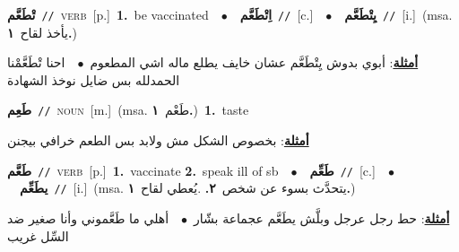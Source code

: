 \documentclass[10pt,a4paper,twoside]{article} %
\begin{document}
\begin{multicols}{2}
{\setlength\topsep{0pt}\textbf{\foreignlanguage{arabic}{تْطَعَّم}}\ {\color{gray}\texttt{//}\color{black}}\ \textsc{verb}\ [p.]\ \textbf{1.}~be vaccinated\ \ $\bullet$\ \ \setlength\topsep{0pt}\textbf{\foreignlanguage{arabic}{اِتْطَعَّم}}\ {\color{gray}\texttt{//}\color{black}}\ [c.]\ \ $\bullet$\ \ \setlength\topsep{0pt}\textbf{\foreignlanguage{arabic}{يِتْطَعَّم}}\ {\color{gray}\texttt{//}\color{black}}\ [i.]\ \color{gray}(msa. \foreignlanguage{arabic}{يأخذ لقاح}~\foreignlanguage{arabic}{\textbf{١.}})\color{black}\  \begin{flushright}\color{gray}\foreignlanguage{arabic}{\textbf{\underline{\foreignlanguage{arabic}{أمثلة}}}: أبوي بدوش يِتْطَعَّم عشان خايف يطلع ماله اشي المطعوم\ $\bullet$\ \  احنا تْطَعَّمْنا الحمدلله بس ضايل نوخذ الشهادة}\end{flushright}\color{black}} \vspace{2mm}

{\setlength\topsep{0pt}\textbf{\foreignlanguage{arabic}{طَعِم}}\ {\color{gray}\texttt{//}\color{black}}\ \textsc{noun}\ [m.]\ \color{gray}(msa. \foreignlanguage{arabic}{طَعْم}~\foreignlanguage{arabic}{\textbf{١.}})\color{black}\ \textbf{1.}~taste\  \begin{flushright}\color{gray}\foreignlanguage{arabic}{\textbf{\underline{\foreignlanguage{arabic}{أمثلة}}}: بخصوص الشكل مش ولابد بس الطعم خرافي بيجنن}\end{flushright}\color{black}} \vspace{2mm}

{\setlength\topsep{0pt}\textbf{\foreignlanguage{arabic}{طَعَّم}}\ {\color{gray}\texttt{//}\color{black}}\ \textsc{verb}\ [p.]\ \textbf{1.}~vaccinate  \textbf{2.}~speak ill of sb\ \ $\bullet$\ \ \setlength\topsep{0pt}\textbf{\foreignlanguage{arabic}{طَعِّم}}\ {\color{gray}\texttt{//}\color{black}}\ [c.]\ \ $\bullet$\ \ \setlength\topsep{0pt}\textbf{\foreignlanguage{arabic}{يطَعِّم}}\ {\color{gray}\texttt{//}\color{black}}\ [i.]\ \color{gray}(msa. \foreignlanguage{arabic}{يتحدَّث بسوء عن شخص}~\foreignlanguage{arabic}{\textbf{٢.}}  .\foreignlanguage{arabic}{يُعطي لقاح}~\foreignlanguage{arabic}{\textbf{١.}})\color{black}\  \begin{flushright}\color{gray}\foreignlanguage{arabic}{\textbf{\underline{\foreignlanguage{arabic}{أمثلة}}}: حط رجل عرجل وبلَّش يطَعَّم عجماعة بشّار\ $\bullet$\ \  أهلي ما طَعَّموني وأنا صغير ضد السِّل غريب}\end{flushright}\color{black}} \vspace{2mm}


\end{multicols}
\end{document}

